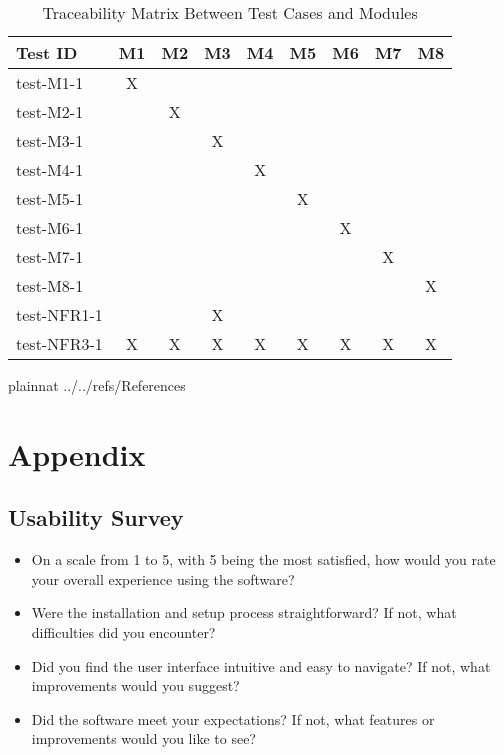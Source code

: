 \documentclass[12pt, titlepage]{article}
\begin{document}
\begin{table}[h!]\label{Table:Unit}
  \centering
  \begin{tabular}{|l|c|c|c|c|c|c|c|c|}
  \hline
  \textbf{Test ID} & \textbf{M1} & \textbf{M2} & \textbf{M3} & \textbf{M4} & \textbf{M5} & \textbf{M6} & \textbf{M7} & \textbf{M8} \\
  \hline
  test-M1-1 & X &   &   &   &   &   &   &   \\
  test-M2-1 &   & X &   &   &   &   &   &   \\
  test-M3-1 &   &   & X &   &   &   &   &   \\
  test-M4-1 &   &   &   & X &   &   &   &   \\
  test-M5-1 &   &   &   &   & X &   &   &   \\
  test-M6-1 &   &   &   &   &   & X &   &   \\
  test-M7-1 &   &   &   &   &   &  &  X &   \\
  test-M8-1 &   &   &   &   &   &   &   & X \\
  \hline
  test-NFR1-1 &   &   & X &   &   &   &   &   \\
  test-NFR3-1 & X & X & X & X & X & X & X & X \\
  \hline
  \end{tabular}
  \caption{Traceability Matrix Between Test Cases and Modules}
  \end{table}

   {plainnat}
   {../../refs/References}

\newpage
\section{Appendix}


\subsection{Usability Survey}\label{US}
\begin{itemize}
\item On a scale from 1 to 5, with 5 being the most satisfied, how would you rate your overall experience using the software?
\item Were the installation and setup process straightforward? If not, what difficulties did you encounter?
\item Did you find the user interface intuitive and easy to navigate? If not, what improvements would you suggest?
\item Did the software meet your expectations? If not, what features or improvements would you like to see?
\end{itemize}
\end{document}
